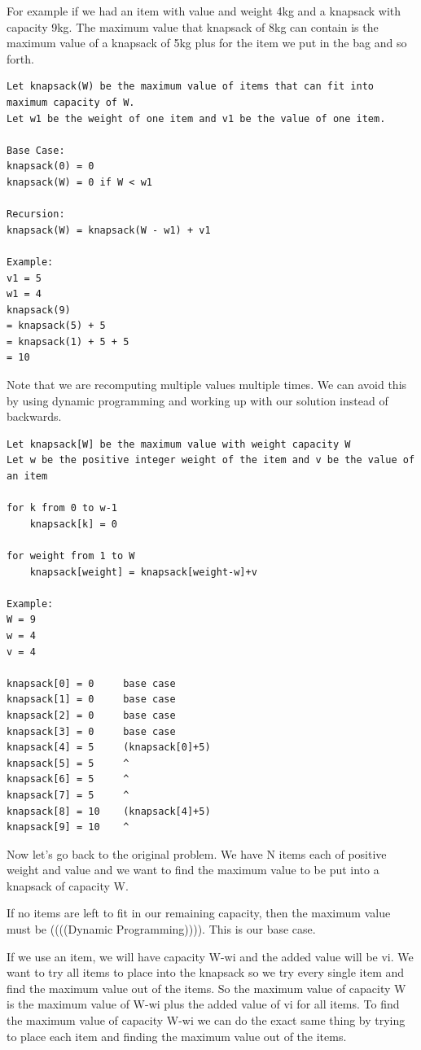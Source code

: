 \documentclass[11pt,oneside]{book}
\begin{document}
For example if we had an item with value  and weight 4kg and a knapsack with capacity 9kg. The maximum value that knapsack of 8kg can contain is the maximum value of a knapsack of 5kg plus  for the item we put in the bag and so forth.

\begin{lstlisting}
Let knapsack(W) be the maximum value of items that can fit into maximum capacity of W.
Let w1 be the weight of one item and v1 be the value of one item.

Base Case:
knapsack(0) = 0
knapsack(W) = 0 if W < w1

Recursion:
knapsack(W) = knapsack(W - w1) + v1

Example:
v1 = 5
w1 = 4
knapsack(9)
= knapsack(5) + 5
= knapsack(1) + 5 + 5
= 10
\end{lstlisting}

Note that we are recomputing multiple values multiple times. We can avoid this by using dynamic programming and working up with our solution instead of backwards.

\begin{lstlisting}
Let knapsack[W] be the maximum value with weight capacity W
Let w be the positive integer weight of the item and v be the value of an item

for k from 0 to w-1
    knapsack[k] = 0

for weight from 1 to W
    knapsack[weight] = knapsack[weight-w]+v

Example:
W = 9
w = 4
v = 4

knapsack[0] = 0     base case
knapsack[1] = 0     base case
knapsack[2] = 0     base case
knapsack[3] = 0     base case
knapsack[4] = 5     (knapsack[0]+5)
knapsack[5] = 5     ^
knapsack[6] = 5     ^
knapsack[7] = 5     ^
knapsack[8] = 10    (knapsack[4]+5)
knapsack[9] = 10    ^
\end{lstlisting}

Now let's go back to the original problem. We have N items each of positive weight and value and we want to find the maximum value to be put into a knapsack of capacity W.

If no items are left to fit in our remaining capacity, then the maximum value must be ((((Dynamic Programming)))). This is our base case.

If we use an item, we will have capacity W-wi and the added value will be vi. We want to try all items to place into the knapsack so we try every single item and find the maximum value out of the items. So the maximum value of capacity W is the maximum value of W-wi plus the added value of vi for all items. To find the maximum value of capacity W-wi we can do the exact same thing by trying to place each item and finding the maximum value out of the items.
\end{document}
